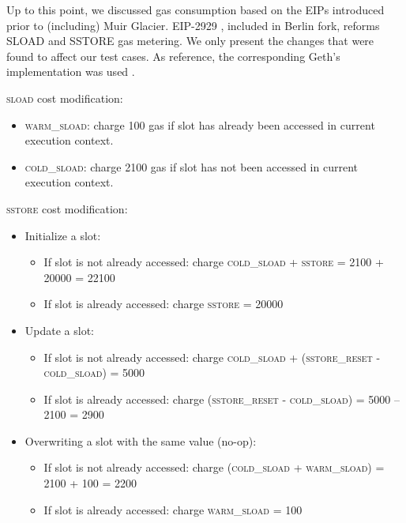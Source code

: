 Up to this point, we discussed gas consumption based on the EIPs introduced prior to (including) Muir Glacier. EIP-2929  \citep{buterin_eip_2929}, included in Berlin fork, reforms SLOAD and SSTORE gas metering. We only present the changes that were found to affect our test cases. As reference, the corresponding Geth’s implementation was used  \citep{ethereum_2022}.

\vspace{0.2cm}
\noindent
\textsc{sload} cost modification:
   \begin{itemize}[topsep=0pt, itemsep=0pt]
     \item  \textsc{warm\_sload}: charge 100 gas if slot has already been accessed in current execution context.
     \item  \textsc{cold\_sload}: charge 2100 gas if slot has not been accessed in current execution context.
   \end{itemize}
   
\vspace{0.2cm}
\noindent
 \textsc{sstore} cost modification:
   \begin{itemize}[topsep=0pt, itemsep=0pt]
     \item  Initialize a slot:
     \begin{itemize}[topsep=0pt, itemsep=0pt]
        \item If slot is not already accessed: charge \textsc{cold\_sload} + \textsc{sstore} = 2100 + 20000 = 22100
        \item If slot is already accessed: charge \textsc{sstore} = 20000
     \end{itemize}
   \end{itemize}
   
   \begin{itemize}[topsep=0pt, itemsep=0pt]
     \item  Update a slot: 
     \begin{itemize}[topsep=0pt, itemsep=0pt]
        \item If slot is not already accessed: charge \textsc{cold\_sload} + \textsc{(sstore\_reset - cold\_sload)} = 5000
        \item If slot is already accessed: charge \textsc{(sstore\_reset - cold\_sload)} = 5000 – 2100 = 2900
     \end{itemize}
   \end{itemize}
   
   \begin{itemize}[topsep=0pt, itemsep=0pt]
     \item  Overwriting a slot with the same value (no-op):
     \begin{itemize}[topsep=0pt, itemsep=0pt]
        \item If slot is not already accessed: charge \textsc{(cold\_sload + warm\_sload)} = 2100 + 100 = 2200
        \item If slot is already accessed: charge \textsc{warm\_sload} = 100 
     \end{itemize}
   \end{itemize}
   
